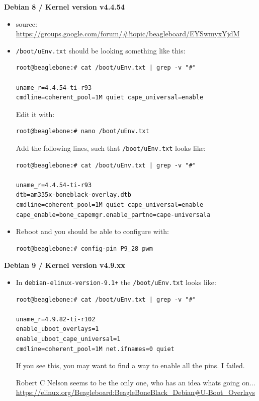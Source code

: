 \documentclass[
	fontsize=10pt
	paper=a4
]{scrartcl}
\begin{document}
\textbf{Debian 8 / Kernel version v4.4.54}
\begin{itemize}
\item source: \url{https://groups.google.com/forum/#!topic/beagleboard/EYSwmyxYjdM}

\item \texttt{/boot/uEnv.txt} should be looking something like this:

\begin{lstlisting}
root@beaglebone:# cat /boot/uEnv.txt | grep -v "#"

uname_r=4.4.54-ti-r93 
cmdline=coherent_pool=1M quiet cape_universal=enable
\end{lstlisting}

Edit it with:
\begin{lstlisting}
root@beaglebone:# nano /boot/uEnv.txt
\end{lstlisting}

Add the following lines, such that \texttt{/boot/uEnv.txt} looks like:
\begin{lstlisting}
root@beaglebone:# cat /boot/uEnv.txt | grep -v "#"

uname_r=4.4.54-ti-r93
dtb=am335x-boneblack-overlay.dtb
cmdline=coherent_pool=1M quiet cape_universal=enable
cape_enable=bone_capemgr.enable_partno=cape-universala
\end{lstlisting}
\item Reboot and you should be able to configure with:
\begin{lstlisting}
root@beaglebone:# config-pin P9_28 pwm
\end{lstlisting}
\end{itemize}


\textbf{Debian 9 / Kernel version v4.9.xx}
\begin{footnotesize}
\begin{itemize}
\item In \texttt{debian-elinux-version-9.1+} the \texttt{/boot/uEnv.txt} looks like:
\begin{lstlisting}
root@beaglebone:# cat /boot/uEnv.txt | grep -v "#"

uname_r=4.9.82-ti-r102
enable_uboot_overlays=1
enable_uboot_cape_universal=1
cmdline=coherent_pool=1M net.ifnames=0 quiet
\end{lstlisting}

If you see this, you may want to find a way to enable all the pins. I failed.

Robert C Nelson seems to be the only one, who has an idea whats going on...
\url{https://elinux.org/Beagleboard:BeagleBoneBlack_Debian#U-Boot_Overlays}

\end{itemize}
\end{footnotesize}
\end{document}
